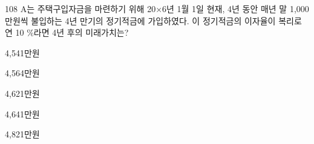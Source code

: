 \begin{question}{108}
A는 주택구입자금을 마련하기 위해 20×6년 1월 1일 현재, 4년 동안 매년 말 1,000만원씩 불입하는 4년 만기의 정기적금에 가입하였다. 이 정기적금의 이자율이 복리로 연 10 \%라면 4년 후의 미래가치는?
\begin{choices}
  \item 4,541만원
  \item 4,564만원
  \item 4,621만원
  \item 4,641만원
  \item 4,821만원
\end{choices}
\end{question}
